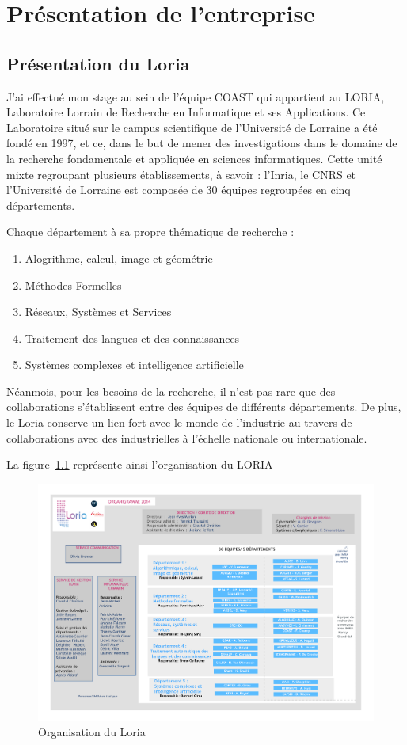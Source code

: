 \documentclass{tnreport}
\begin{document}
\chapter{Présentation de l'entreprise}

\section{Présentation du Loria}

J'ai effectué mon stage au sein de l'équipe COAST qui appartient au LORIA, Laboratoire Lorrain de Recherche en Informatique et ses Applications. 
Ce Laboratoire situé sur le campus scientifique de l'Université de Lorraine a été fondé en 1997, et ce, dans le but 
de mener des investigations dans le domaine de la recherche fondamentale et appliquée en sciences informatiques. 
Cette unité mixte regroupant plusieurs établissements, à savoir : l'Inria, le CNRS et l'Université de Lorraine est composée 
de 30 équipes regroupées en cinq départements.

Chaque département à sa propre thématique de recherche :

\begin{enumerate}
  \item Alogrithme, calcul, image et géométrie
  \item Méthodes Formelles
  \item Réseaux, Systèmes et Services
  \item Traitement des langues et des connaissances
  \item Systèmes complexes et intelligence artificielle
\end{enumerate}

Néanmois, pour les besoins de la recherche, il n'est pas rare que des collaborations s'établissent entre des équipes de différents départements. De plus, le Loria conserve un lien fort avec le monde de l'industrie au travers de collaborations avec des industrielles à l'échelle nationale ou internationale.

La figure~\ref{fig:orga} représente ainsi l'organisation du LORIA 

\begin{figure}[h!]
  \centering
  \includegraphics[width=18cm]{figures/organization}
  \caption{Organisation du Loria}
  \label{fig:orga}
\end{figure}
\end{document}

